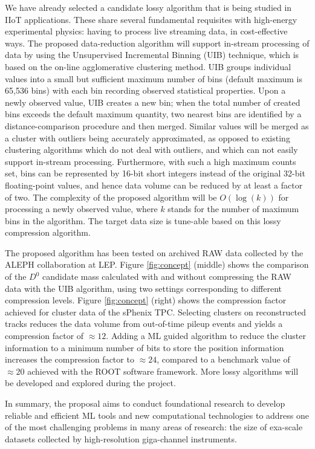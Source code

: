 \vspace{-0.8cm}
We have already selected a candidate lossy algorithm that is being studied  in  IIoT applications. These share several fundamental requisites with  high-energy experimental physics: having to process live streaming data, in cost-effective ways. The proposed data-reduction algorithm will support in-stream processing of data by using the Unsupervised Incremental Binning (UIB) technique, which is based on the on-line agglomerative clustering method. UIB groups individual values into a small but sufficient maximum number of bins (default maximum is 65,536 bins) with each bin recording observed statistical properties. Upon a newly observed value, UIB creates a new bin; when the total number of created bins exceeds the default maximum quantity, two nearest bins are identified by a distance-comparison procedure and then merged. Similar values will be merged as a cluster with  outliers being accurately approximated, as opposed to  existing clustering algorithms which do not deal with outliers, and which can not easily support in-stream processing. Furthermore, with such a high maximum counts set, bins can be represented by 16-bit short integers instead of the original 32-bit floating-point values, and hence data volume can be reduced by at least a factor of two. The complexity of the proposed algorithm will be $O(\log(k))$ for processing a newly observed value, where $k$ stands for the number of maximum bins in the algorithm. The target data size is tune-able based on this lossy compression algorithm. 

The proposed algorithm has been tested on archived RAW data collected by the ALEPH collaboration at LEP. Figure \ref{fig:concept} (middle) shows the comparison of the $D^0$ candidate mass calculated with and without compressing the RAW data with the UIB algorithm, using two settings corresponding to different compression levels. %
Figure \ref{fig:concept} (right) shows the compression factor achieved for cluster data of the sPhenix TPC. Selecting clusters on reconstructed tracks reduces the data volume from out-of-time pileup events and yields a compression factor of $\approx 12$. Adding a ML guided algorithm to reduce the cluster information to a minimum number of bits to store the position information increases the compression factor to $\approx 24$, compared to a benchmark value of $\approx 20$ achieved with the ROOT software framework. More lossy algorithms will be developed and explored during the project.

In summary, the proposal aims to conduct foundational research to develop reliable and efficient ML tools and new computational technologies to address one of the most challenging problems in many areas of research: the size of exa-scale datasets collected by high-resolution giga-channel instruments. 
\clearpage
